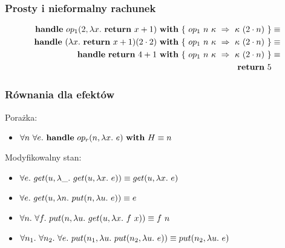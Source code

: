 \begin{frame}
  \frametitle{Prosty i nieformalny rachunek}
  \begin{example}
    \vspace{-1em}
  \begin{equation*}\begin{split}%
      \handle{\opi{1}{2}{\fun{x}{\return{x + 1}}}}{\{\ \hcase{op_1}{n\ \kappa}{\kappa\ (2 \cdot n)} \ \}} &\equiv \\
      \handle{(\fun{x}{\return{x+1}}) (2 \cdot 2)}{\{\ \hcase{op_1}{n\ \kappa}{\kappa\ (2 \cdot n)} \ \}} &\equiv \\
      \handle{\return{4+1}}{\{\ \hcase{op_1}{n\ \kappa}{\kappa\ (2 \cdot n)} \ \}} &\equiv \\
      \return{5} %
  \end{split}\end{equation*}
  \end{example}
\end{frame}

\begin{frame}
  \frametitle{Równania dla efektów}

  Porażka:
  \begin{itemize}
    \item \(\forall n\ \forall e.\ \mathbf{handle}\ op_r(n, \lambda x.\ e)\ \mathbf{with}\ H \equiv n\)
  \end{itemize}

  \vspace{1em}

  Modyfikowalny stan:
  \begin{itemize}
  \item \(\forall e.\ get(u, \lambda \_.\ get(u, \lambda x.\ e)) \equiv get(u, \lambda x.\ e)\)
  \item \(\forall e.\ get(u, \lambda n.\ put(n, \lambda u.\ e)) \equiv e\)
  \item \(\forall n.\ \forall f.\ put(n, \lambda u.\ get(u, \lambda x.\ f\ x)) \equiv f\ n\)
  \item \(\forall n_1.\ \forall n_2.\ \forall e.\ put(n_1, \lambda u.\ put(n_2, \lambda u.\ e)) \equiv put(n_2, \lambda u.\ e)\)
  \end{itemize}
\end{frame}

